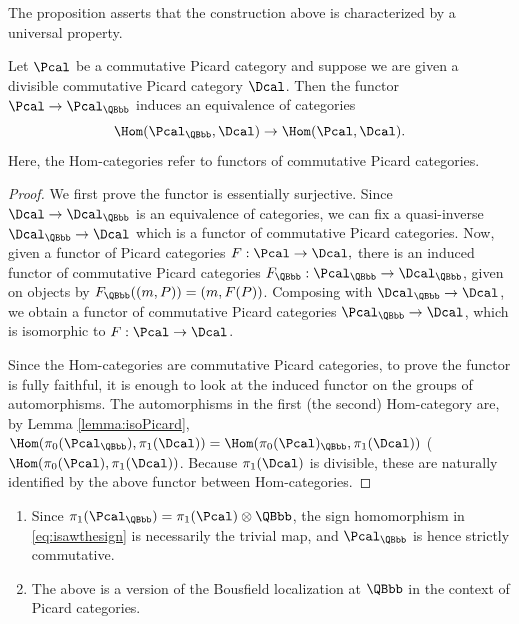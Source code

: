 The proposition asserts that the construction above is characterized by a universal property.

\begin{proposition}\label{prop:rationalization}
Let $\Pcal$ be a commutative Picard category and suppose we are given a divisible commutative Picard category $\Dcal$. Then the functor $\Pcal\to\Pcal_{\QBbb}$ induces an equivalence of categories\vspace*{-3pt}\enlargethispage{\baselineskip}
\begin{displaymath}
\Hom(\Pcal_\QBbb, \Dcal) \to \Hom(\Pcal, \Dcal).
\end{displaymath}
Here, the Hom-categories refer to functors of commutative Picard categories.
\end{proposition}
\begin{proof}
We first prove the functor is essentially surjective. Since $\Dcal\to\Dcal_{\QBbb}$ is an equivalence of categories, we can fix a quasi-inverse $\Dcal_{\QBbb}\to\Dcal$ which is a functor of commutative Picard categories. Now, given a functor of Picard categories $F: \Pcal \to \Dcal, $ there is an induced functor of commutative Picard categories $F_\QBbb: \Pcal_\QBbb \to \Dcal_\QBbb$, given on objects by $F_\QBbb((m, P)) = (m, F(P))$. Composing with $\Dcal_{\QBbb}\to\Dcal$, we obtain a functor of commutative Picard categories $\Pcal_{\QBbb}\to\Dcal$, which is isomorphic to $F: \Pcal \to \Dcal$.

Since the Hom-categories are commutative Picard categories, to prove the functor is fully faithful, it is enough to look at the induced functor on the groups of automorphisms. The automorphisms in the first (\resp the second) Hom-category are, by Lemma \ref{lemma:isoPicard},
$\Hom(\pi_0(\Pcal_\QBbb), \pi_1(\Dcal)) = \Hom(\pi_0(\Pcal)_\QBbb, \pi_1(\Dcal))$ (\resp $\Hom(\pi_0(\Pcal), \pi_1(\Dcal))$. Because $\pi_{1}(\Dcal)$ is divisible, these are naturally identified by the above functor between Hom-categories.
\end{proof}

\skpt
\begin{remark}\label{rem:Q-Bousfield}
\begin{enumerate}
\item \label{item:Q-Bousfield-1} Since $\pi_1(\Pcal_\QBbb) = \pi_1(\Pcal)\otimes\QBbb$, the sign homomorphism in \eqref{eq:isawthesign} is necessarily the trivial map, and $\Pcal_\QBbb$ is hence strictly commutative.
\item \label{item:Q-Bousfield-2} The above is a version of the Bousfield localization at $\QBbb$ in the context of Picard categories.
\end{enumerate}
\end{remark}

